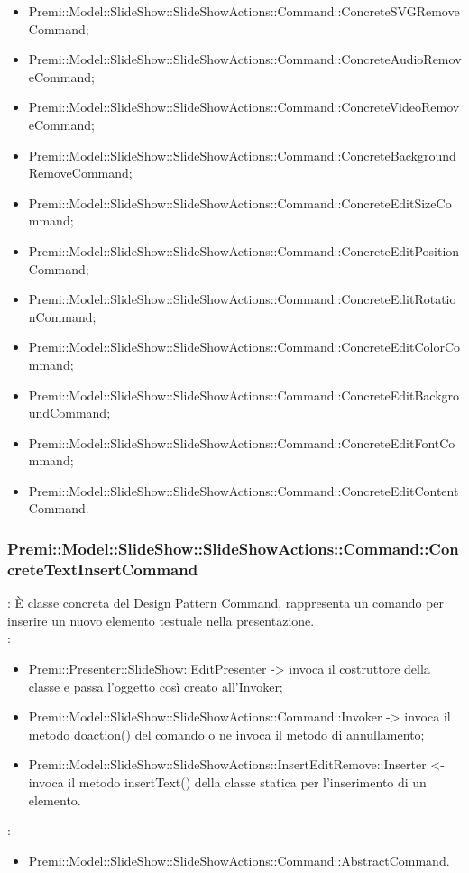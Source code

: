 {{\begin{itemize}
                    \item Premi::Model::SlideShow::SlideShowActions::Command::ConcreteSVGRemoveCommand;
                    \item Premi::Model::SlideShow::SlideShowActions::Command::ConcreteAudioRemoveCommand;
                    \item Premi::Model::SlideShow::SlideShowActions::Command::ConcreteVideoRemoveCommand;
                    \item Premi::Model::SlideShow::SlideShowActions::Command::ConcreteBackgroundRemoveCommand;
                    \item Premi::Model::SlideShow::SlideShowActions::Command::ConcreteEditSizeCommand;
                    \item Premi::Model::SlideShow::SlideShowActions::Command::ConcreteEditPositionCommand;
                    \item Premi::Model::SlideShow::SlideShowActions::Command::ConcreteEditRotationCommand;
                    \item Premi::Model::SlideShow::SlideShowActions::Command::ConcreteEditColorCommand;
                    \item Premi::Model::SlideShow::SlideShowActions::Command::ConcreteEditBackgroundCommand;
                    \item Premi::Model::SlideShow::SlideShowActions::Command::ConcreteEditFontCommand;
                    \item Premi::Model::SlideShow::SlideShowActions::Command::ConcreteEditContentCommand.
                    \end{itemize}
                    }
    \subsubsection{Premi::Model::SlideShow::SlideShowActions::Command::ConcreteTextInsertCommand}{
				\textbf{\tipo}: È classe concreta del Design Pattern Command, rappresenta un comando per inserire un nuovo elemento testuale nella presentazione.\\	
				\textbf{\relaz}: 
				\begin{itemize}
					\item Premi::Presenter::SlideShow::EditPresenter -> invoca il costruttore della classe e passa l’oggetto così creato all’Invoker;
					\item Premi::Model::SlideShow::SlideShowActions::Command::Invoker -> invoca il metodo doaction() del comando o ne invoca il metodo di annullamento;
                    \item Premi::Model::SlideShow::SlideShowActions::InsertEditRemove::Inserter <- invoca il metodo insertText() della classe statica per l’inserimento di un elemento.
				\end{itemize}	
                \textbf{\base}: 
                    \begin{itemize}
                    \item Premi::Model::SlideShow::SlideShowActions::Command::AbstractCommand.
                    \end{itemize}
                    }
}
